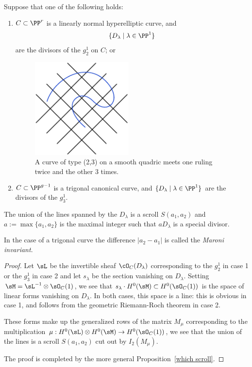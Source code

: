 \begin{corollary}\label{hyperelliptic and trigonal} Suppose that one of the following holds:
\begin{enumerate}
 \item  $C\subset \PP^r$ is a linearly normal hyperelliptic curve, and  
$$
\{D_\lambda \mid \lambda \in \PP^1\}
$$
are the divisors of the $g^1_2$ on $C$; or


\begin{figure}
\centerline {\includegraphics[height=2in]{"main/Fig16-2"}}
\caption{A curve of type (2,3) on a smooth quadric meets one ruling twice and the other 3 times.}
\label{default}
\end{figure}

\item $C\subset \PP^{g-1}$ is a trigonal canonical curve, and  
$\{D_\lambda \mid \lambda \in \PP^1\}$
are the divisors of the $g^1_3$.
\end{enumerate}

The union of the lines spanned by the $D_\lambda$
is a scroll $S(a_1,a_2)$ and $a:= \max\{a_1, a_2\}$ is the maximal integer such that
$aD_\lambda$ is a special divisor.
\end{corollary}

\begin{remark}
 In the case of a trigonal curve the difference $|a_2-a_1|$ is called the \emph{Maroni invariant}.
\end{remark}
\begin{proof}
Let $\sL$ be the invertible sheaf $\cO_C(D_\lambda)$ corresponding to the $g^1_2$ in case 1 or
the $g_3^1$ in case 2 and let $s_\lambda$ be
the section vanishing on $D_\lambda$. Setting $\sM =  \sL^{-1}\otimes \sO_C(1)$, we see that
$s_\lambda\cdot H^0(\sM) \subset H^0(\sO_C(1))$ is the space of linear forms vanishing on
$D_\lambda$. In both cases, this space is a line: this is obvious in case 1, and follows from the 
geometric Riemann-Roch theorem in case 2. 

These forms make up the
generalized rows of the matrix $M_\mu$ corresponding to the multiplication
$\mu: H^0(\sL)\otimes H^0(\sM) \to H^0(\sO_C(	1))$, we see that the union of the lines is a
scroll $S(a_1,a_2)$ cut out by $I_2(M_\mu)$.

The proof is completed by the more general Proposition~\ref{which scroll}.
\end{proof}

